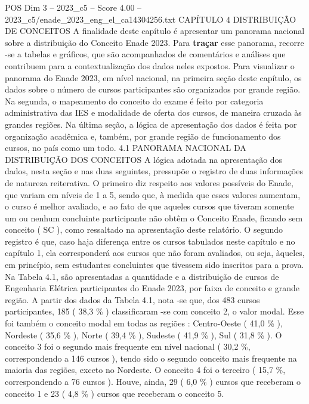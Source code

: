 \begin{textsample}{POS Dim 3 – 2023\_c5 – Score 4.00 – 2023\_c5/enade\_2023\_eng\_el\_ca14304256.txt}  \label{ex:f3_pos_059}
CAPÍTULO 4 DISTRIBUIÇÃO DE CONCEITOS A finalidade deste capítulo é apresentar um panorama nacional sobre a distribuição do Conceito Enade 2023.
Para \textbf{traçar} esse panorama, recorre -se a tabelas e gráficos, que são acompanhados de comentários e análises que contribuem para a contextualização dos dados neles expostos.
Para visualizar o panorama do Enade 2023, em nível nacional, na primeira seção deste capítulo, os dados sobre o número de cursos participantes são organizados por grande região.
Na segunda, o mapeamento do conceito do exame é feito por categoria administrativa das IES e modalidade de oferta dos cursos, de maneira cruzada às grandes regiões.
Na última seção, a lógica de apresentação dos dados é feita por organização acadêmica e, também, por grande região de funcionamento dos cursos, no país como um todo. 4.1 PANORAMA NACIONAL DA DISTRIBUIÇÃO DOS CONCEITOS A lógica adotada na apresentação dos dados, nesta seção e nas duas seguintes, pressupõe o registro de duas informações de natureza reiterativa.
O primeiro diz respeito aos valores possíveis do Enade, que variam em níveis de 1 a 5, sendo que, à medida que esses valores aumentam, o curso é melhor avaliado, e ao fato de que aqueles cursos que tiveram somente um ou nenhum concluinte participante não obtêm o Conceito Enade, ficando sem conceito ( SC ), como ressaltado na apresentação deste relatório.
O segundo registro é que, caso haja diferença entre os cursos tabulados neste capítulo e no capítulo 1, ela corresponderá aos cursos que não foram avaliados, ou seja, àqueles, em princípio, sem estudantes concluintes que tivessem sido inscritos para a prova.
Na Tabela 4.1, são apresentadas a quantidade e a distribuição de cursos de Engenharia Elétrica participantes do Enade 2023, por faixa de conceito e grande região.
A partir dos dados da Tabela 4.1, nota -se que, dos 483 cursos participantes, 185 ( 38,3 \% ) classificaram -se com conceito 2, o valor modal.
Esse foi também o conceito modal em todas as regiões : Centro-Oeste ( 41,0 \% ), Nordeste ( 35,6 \% ), Norte ( 39,4 \% ), Sudeste ( 41,9 \% ), Sul ( 31,8 \% ).
O conceito 3 foi o segundo mais frequente em nível nacional ( 30,2 \%, correspondendo a 146 cursos ), tendo sido o segundo conceito mais frequente na maioria das regiões, exceto no Nordeste.
O conceito 4 foi o terceiro ( 15,7 \%, correspondendo a 76 cursos ).
Houve, ainda, 29 ( 6,0 \% ) cursos que receberam o conceito 1 e 23 ( 4,8 \% ) cursos que receberam o conceito 5.

\end{textsample}

